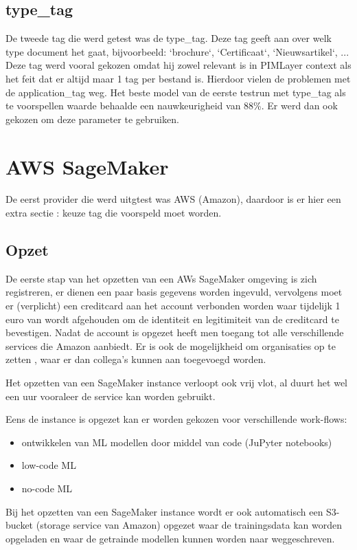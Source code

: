 \subsection{type\_tag}
De tweede tag die werd getest was de type\_tag. Deze tag geeft aan over welk type document het gaat, bijvoorbeeld: `brochure`, `Certificaat`, `Nieuwsartikel`, ... Deze tag werd vooral gekozen omdat hij zowel relevant is in PIMLayer context als het feit dat er altijd maar 1 tag per bestand is. Hierdoor vielen de problemen met de application\_tag weg. Het beste model van de eerste testrun met type\_tag als te voorspellen waarde behaalde een nauwkeurigheid van 88\%. Er werd dan ook gekozen om deze parameter te gebruiken. 

\section{AWS SageMaker}
De eerst provider die werd uitgtest was AWS (Amazon), daardoor is er hier een extra sectie : keuze tag die voorspeld moet worden. 
\subsection{Opzet}
De eerste stap van het opzetten van een AWs SageMaker omgeving is zich registreren, er dienen een paar basis gegevens worden ingevuld, vervolgens moet er (verplicht) een creditcard aan het account verbonden worden waar tijdelijk 1 euro van wordt afgehouden om de identiteit en legitimiteit van de creditcard te bevestigen. Nadat de account is opgezet heeft men toegang tot alle verschillende services die Amazon aanbiedt. Er is ook de mogelijkheid om organisaties op te zetten , waar er dan collega's kunnen aan toegevoegd worden.

Het opzetten van een SageMaker instance verloopt ook vrij vlot, al duurt het wel een uur vooraleer de service kan worden gebruikt. 

Eens de instance is opgezet kan er worden gekozen voor verschillende work-flows: 
\begin{itemize}
    \item ontwikkelen van ML modellen door middel van code (JuPyter notebooks)
    \item low-code ML
    \item no-code ML
\end{itemize}

Bij het opzetten van een SageMaker instance wordt er ook automatisch een S3-bucket (storage service van Amazon) opgezet waar de trainingsdata kan worden opgeladen en waar de getrainde modellen kunnen worden naar weggeschreven. 

